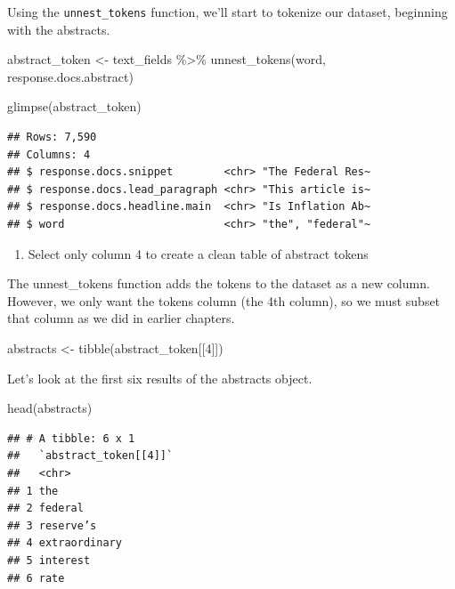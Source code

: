 \documentclass[
  krantz2]{krantz}
\makeatletter
\newenvironment{Shaded}{\begin{snugshade}}{\end{snugshade}}
\newcommand{\DecValTok}[1]{\textcolor[rgb]{0.06,0.06,0.06}{#1}}
\newcommand{\FunctionTok}[1]{\textcolor[rgb]{0,0,0}{#1}}
\newcommand{\NormalTok}[1]{#1}
\newcommand{\OtherTok}[1]{\textcolor[rgb]{0.37,0.37,0.37}{#1}}
\newcommand{\SpecialCharTok}[1]{\textcolor[rgb]{0,0,0}{#1}}
\providecommand{\tightlist}{%
  \setlength{\itemsep}{0pt}\setlength{\parskip}{0pt}}
\newenvironment{kframe}{%
\medskip{}
\setlength{\fboxsep}{.8em}
 \def\at@end@of@kframe{}%
 \ifinner\ifhmode%
  \def\at@end@of@kframe{\end{minipage}}%
  \begin{minipage}{\columnwidth}%
 \fi\fi%
 \def\FrameCommand##1{\hskip\@totalleftmargin \hskip-\fboxsep
 \colorbox{shadecolor}{##1}\hskip-\fboxsep
     \hskip-\linewidth \hskip-\@totalleftmargin \hskip\columnwidth}%
 \MakeFramed {\advance\hsize-\width
   \@totalleftmargin\z@ \linewidth\hsize
   \@setminipage}}%
 {\par\unskip\endMakeFramed%
 \at@end@of@kframe}
\renewenvironment{Shaded}{\begin{kframe}}{\end{kframe}}
\makeatother
\begin{document}
Using the \texttt{unnest\_tokens} function, we'll start to tokenize our dataset, beginning with the abstracts.

\begin{Shaded}
\begin{Highlighting}[]
\NormalTok{abstract\_token }\OtherTok{\textless{}{-}}\NormalTok{ text\_fields }\SpecialCharTok{\%\textgreater{}\%}
  \FunctionTok{unnest\_tokens}\NormalTok{(word, response.docs.abstract)}

\FunctionTok{glimpse}\NormalTok{(abstract\_token)}
\end{Highlighting}
\end{Shaded}

\begin{verbatim}
## Rows: 7,590
## Columns: 4
## $ response.docs.snippet        <chr> "The Federal Res~
## $ response.docs.lead_paragraph <chr> "This article is~
## $ response.docs.headline.main  <chr> "Is Inflation Ab~
## $ word                         <chr> "the", "federal"~
\end{verbatim}

\begin{enumerate}
\def\labelenumi{\arabic{enumi}.}
\setcounter{enumi}{1}
\tightlist
\item
  Select only column 4 to create a clean table of abstract tokens
\end{enumerate}

The unnest\_tokens function adds the tokens to the dataset as a new column. However, we only want the tokens column (the 4th column), so we must subset that column as we did in earlier chapters.

\begin{Shaded}
\begin{Highlighting}[]
\NormalTok{abstracts }\OtherTok{\textless{}{-}} \FunctionTok{tibble}\NormalTok{(abstract\_token[[}\DecValTok{4}\NormalTok{]])}
\end{Highlighting}
\end{Shaded}

Let's look at the first six results of the abstracts object.

\begin{Shaded}
\begin{Highlighting}[]
\FunctionTok{head}\NormalTok{(abstracts)}
\end{Highlighting}
\end{Shaded}

\begin{verbatim}
## # A tibble: 6 x 1
##   `abstract_token[[4]]`
##   <chr>
## 1 the
## 2 federal
## 3 reserve’s
## 4 extraordinary
## 5 interest
## 6 rate
\end{verbatim}
\end{document}
